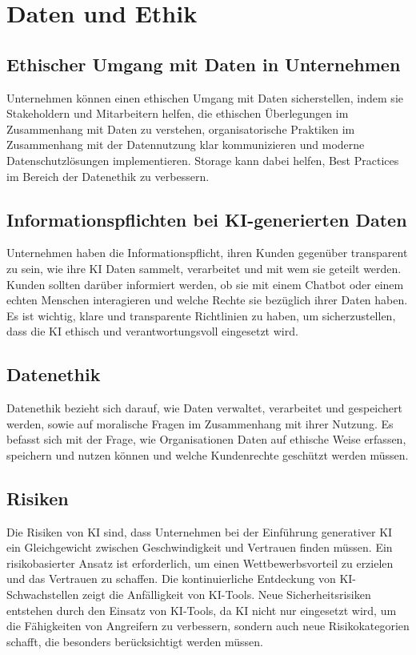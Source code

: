 \section{Daten und Ethik}
\subsection{Ethischer Umgang mit Daten in Unternehmen}

Unternehmen können einen ethischen Umgang mit Daten sicherstellen, indem sie Stakeholdern und Mitarbeitern helfen, die ethischen Überlegungen im Zusammenhang mit Daten zu verstehen, organisatorische Praktiken im Zusammenhang mit der Datennutzung klar kommunizieren und moderne Datenschutzlösungen implementieren. Storage kann dabei helfen, Best Practices im Bereich der Datenethik zu verbessern.
\citep{ai-ethik-pure}

\subsection{Informationspflichten bei KI-generierten Daten}

Unternehmen haben die Informationspflicht, ihren Kunden gegenüber transparent zu sein, wie ihre KI Daten sammelt, verarbeitet und mit wem sie geteilt werden. Kunden sollten darüber informiert werden, ob sie mit einem Chatbot oder einem echten Menschen interagieren und welche Rechte sie bezüglich ihrer Daten haben. Es ist wichtig, klare und transparente Richtlinien zu haben, um sicherzustellen, dass die KI ethisch und verantwortungsvoll eingesetzt wird.
\citep{ai-res-cmm360}

\subsection{Datenethik}

Datenethik bezieht sich darauf, wie Daten verwaltet, verarbeitet und gespeichert werden, sowie auf moralische Fragen im Zusammenhang mit ihrer Nutzung. Es befasst sich mit der Frage, wie Organisationen Daten auf ethische Weise erfassen, speichern und nutzen können und welche Kundenrechte geschützt werden müssen.
\citep{ai-ethik-pure}

\subsection{Risiken}
Die Risiken von KI sind, dass Unternehmen bei der Einführung generativer KI ein Gleichgewicht zwischen Geschwindigkeit und Vertrauen finden müssen. Ein risikobasierter Ansatz ist erforderlich, um einen Wettbewerbsvorteil zu erzielen und das Vertrauen zu schaffen. Die kontinuierliche Entdeckung von KI-Schwachstellen zeigt die Anfälligkeit von KI-Tools. Neue Sicherheitsrisiken entstehen durch den Einsatz von KI-Tools, da KI nicht nur eingesetzt wird, um die Fähigkeiten von Angreifern zu verbessern, sondern auch neue Risikokategorien schafft, die besonders berücksichtigt werden müssen.
\citep{ai-risk}